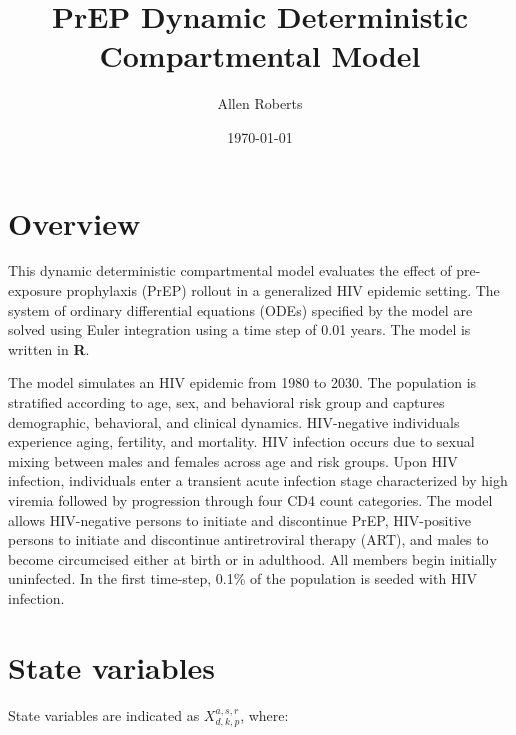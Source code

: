 \documentclass[11pt,a4paper]{article}
\begin{document}
\begin{titlepage}
	\title{PrEP Dynamic Deterministic Compartmental Model}
	\date{\today}
	\author{Allen Roberts}
\end{titlepage}
\maketitle

\tableofcontents

\section{Overview}
This dynamic deterministic compartmental model evaluates the effect of pre-exposure prophylaxis (PrEP) rollout in a generalized HIV epidemic setting. The system of ordinary differential equations (ODEs) specified by the model are solved using Euler integration using a time step of 0.01 years. The model is written in \textbf{R}. 

The model simulates an HIV epidemic from 1980 to 2030. The population is stratified according to age, sex, and behavioral risk group and captures demographic, behavioral, and clinical dynamics. HIV-negative individuals experience aging, fertility, and mortality. HIV infection occurs due to sexual mixing between males and females across age and risk groups. Upon HIV infection, individuals enter a transient acute infection stage characterized by high viremia followed by progression through four CD4 count categories. The model allows HIV-negative persons to initiate and discontinue PrEP, HIV-positive persons to initiate and discontinue antiretroviral therapy (ART), and males to become circumcised either at birth or in adulthood. All members begin initially uninfected. In the first time-step, 0.1\% of the population is seeded with HIV infection. 

\section{State variables}
State variables are indicated as $X_{d,k,p}^{a,s,r}$, where:
\end{document}
